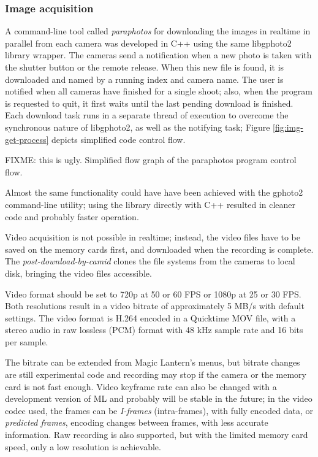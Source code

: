 
\subsubsection{Image acquisition} %


A command-line tool called \emph{paraphotos} for downloading the images in realtime in parallel from each camera was developed in C++ using the same libgphoto2 library wrapper.
The cameras send a notification when a new photo is taken with the shutter button or the remote release.
When this new file is found, it is downloaded and named by a running index and camera name.
The user is notified when all cameras have finished for a single shoot;
also, when the program is requested to quit, it first waits until the last pending download is finished.
Each download task runs in a separate thread of execution to overcome the synchronous nature of libgphoto2, as well as the notifying task; Figure \ref{fig:img-get-process} depicts simplified code control flow.

{FIXME: this is ugly. Simplified flow graph of the paraphotos program control flow.}

Almost the same functionality could have have been achieved with the gphoto2 command-line utility; using the library directly with C++ resulted in cleaner code and probably faster operation.

Video acquisition is not possible in realtime; instead, the video files have to be saved on the memory cards first, and downloaded when the recording is complete.
The \emph{post-download-by-camid} clones the file systems from the cameras to local disk, bringing the video files accessible.

Video format should be set to 720p at 50 or 60 FPS or 1080p at 25 or 30 FPS.
Both resolutions result in a video bitrate of approximately 5 MB/s with default settings.
The video format is H.264 encoded in a Quicktime MOV file, with a stereo audio in raw lossless (PCM) format with 48 kHz sample rate and 16 bits per sample.

The bitrate can be extended from Magic Lantern's menus, but bitrate changes are still experimental code and recording may stop if the camera or the memory card is not fast enough.
Video keyframe rate can also be changed with a development version of ML and probably will be stable in the future;
in the video codec used, the frames can be \emph{I-frames} (intra-frames), with fully encoded data, or \emph{predicted frames}, encoding changes between frames, with less accurate information.
Raw recording is also supported, but with the limited memory card speed, only a low resolution is achievable.

